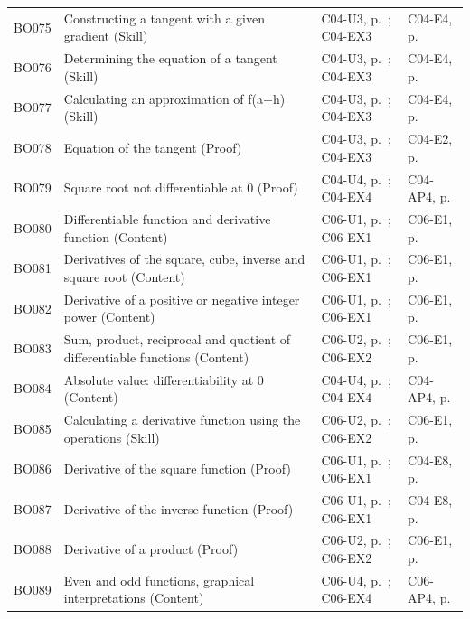 \begin{longtable}{p{.1\linewidth}p{.43\linewidth}p{.19\linewidth}p{.16\linewidth}}
BO075 & Constructing a tangent with a given gradient (Skill) & C04-U3, p.\,\pageref{C04-U3} ; C04-EX3 & C04-E4, p.\,\pageref{C04-E4} \\
BO076 & Determining the equation of a tangent (Skill) & C04-U3, p.\,\pageref{C04-U3} ; C04-EX3 & C04-E4, p.\,\pageref{C04-E4} \\
BO077 & Calculating an approximation of f(a+h) (Skill) & C04-U3, p.\,\pageref{C04-U3} ; C04-EX3 & C04-E4, p.\,\pageref{C04-E4} \\
BO078 & Equation of the tangent (Proof) & C04-U3, p.\,\pageref{C04-U3} ; C04-EX3 & C04-E2, p.\,\pageref{C04-E2} \\
BO079 & Square root not differentiable at 0 (Proof) & C04-U4, p.\,\pageref{C04-U4} ; C04-EX4 & C04-AP4, p.\,\pageref{C04-AP4} \\
BO080 & Differentiable function and derivative function (Content) & C06-U1, p.\,\pageref{C06-U1} ; C06-EX1 & C06-E1, p.\,\pageref{C06-E1} \\
BO081 & Derivatives of the square, cube, inverse and square root (Content) & C06-U1, p.\,\pageref{C06-U1} ; C06-EX1 & C06-E1, p.\,\pageref{C06-E1} \\
BO082 & Derivative of a positive or negative integer power (Content) & C06-U1, p.\,\pageref{C06-U1} ; C06-EX1 & C06-E1, p.\,\pageref{C06-E1} \\
BO083 & Sum, product, reciprocal and quotient of differentiable functions (Content) & C06-U2, p.\,\pageref{C06-U2} ; C06-EX2 & C06-E1, p.\,\pageref{C06-E1} \\
BO084 & Absolute value: differentiability at 0 (Content) & C04-U4, p.\,\pageref{C04-U4} ; C04-EX4 & C04-AP4, p.\,\pageref{C04-AP4} \\
BO085 & Calculating a derivative function using the operations (Skill) & C06-U2, p.\,\pageref{C06-U2} ; C06-EX2 & C06-E1, p.\,\pageref{C06-E1} \\
BO086 & Derivative of the square function (Proof) & C06-U1, p.\,\pageref{C06-U1} ; C06-EX1 & C04-E8, p.\,\pageref{C04-E8} \\
BO087 & Derivative of the inverse function (Proof) & C06-U1, p.\,\pageref{C06-U1} ; C06-EX1 & C04-E8, p.\,\pageref{C04-E8} \\
BO088 & Derivative of a product (Proof) & C06-U2, p.\,\pageref{C06-U2} ; C06-EX2 & C06-E1, p.\,\pageref{C06-E1} \\
BO089 & Even and odd functions, graphical interpretations (Content) & C06-U4, p.\,\pageref{C06-U4} ; C06-EX4 & C06-AP4, p.\,\pageref{C06-AP4} \\

\end{longtable}
